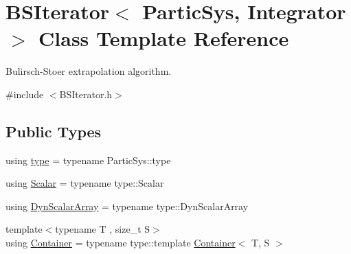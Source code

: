 \hypertarget{class_b_s_iterator}{}\section{B\+S\+Iterator$<$ Partic\+Sys, Integrator $>$ Class Template Reference}
\label{class_b_s_iterator}


Bulirsch-\/\+Stoer extrapolation algorithm.  




{\ttfamily \#include $<$B\+S\+Iterator.\+h$>$}

\subsection*{Public Types}
\begin{DoxyCompactItemize}
\item 
using \mbox{\hyperlink{class_b_s_iterator_a19530085797de211565a566f581f20ca}{type}} = typename Partic\+Sys\+::type
\item 
using \mbox{\hyperlink{class_b_s_iterator_a44773ad0f46d97005c8e21fa7c155c6f}{Scalar}} = typename type\+::\+Scalar
\item 
using \mbox{\hyperlink{class_b_s_iterator_a9a340a2f29d147d137a7459886736dd6}{Dyn\+Scalar\+Array}} = typename type\+::\+Dyn\+Scalar\+Array
\item 
{\footnotesize template$<$typename T , size\+\_\+t S$>$ }\\using \mbox{\hyperlink{class_b_s_iterator_a1cb5a9b8f7ff3746a15007780c9a7b87}{Container}} = typename type\+::template \mbox{\hyperlink{class_b_s_iterator_a1cb5a9b8f7ff3746a15007780c9a7b87}{Container}}$<$ T, S $>$
\end{DoxyCompactItemize}
